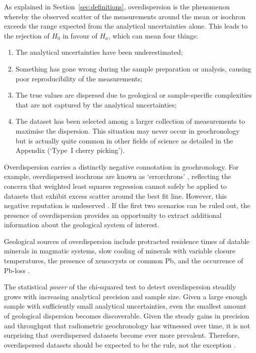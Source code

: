 \documentclass[gchron, manuscript]{copernicus}
\begin{document}
As explained in Section~\ref{sec:definitions}, overdispersion is the
phenomenon whereby the observed scatter of the measurements around the
mean or isochron exceeds the range expected from the analytical
uncertainties alone. This leads to the rejection of $H_0$ in favour of
$H_a$, which can mean four things:

\begin{enumerate}
\item The analytical uncertainties have been underestimated;
\item Something has gone wrong during the sample preparation or
  analysis, causing poor reproducibility of the measurements;
\item The true values are dispersed due to geological or
  sample-specific complexities that are not captured by the analytical
  uncertainties;
\item The dataset has been selected among a larger collection of
  measurements to maximise the dispersion. This situation may never
  occur in geochronology but is actually quite common in other fields
  of science as detailed in the Appendix (`Type~I cherry picking').
\end{enumerate}

Overdispersion carries a distinctly negative connotation in
geochronology. For example, overdispersed isochrons are known as
`errorchrons' \citep{brooks1972}, reflecting the concern that weighted
least squares regression cannot safely be applied to datasets that
exhibit excess scatter around the best fit line. However, this
negative reputation is undeserved \citep{kalsbeek1992}. If the first
two scenarios can be ruled out, the presence of overdispersion
provides an opportunity to extract additional information about the
geological system of interest.\medskip

Geological sources of overdispersion include protracted residence
times of datable minerals in magmatic systems, slow cooling of
minerals with variable closure temperatures, the presence of
xenocrysts or common Pb, and the occurrence of Pb-loss
\citep{galbraith1993,rioux2012,keller2018,klein2024}.\medskip

The statistical \emph{power} of the chi-squared test to detect
overdispersion steadily grows with increasing analytical precision and
sample size. Given a large enough sample with sufficiently small
analytical uncertainties, even the smallest amount of geological
dispersion becomes discoverable.  Given the steady gains in precision
and throughput that radiometric geochronology has witnessed over time,
it is not surprising that overdispersed datasets become ever more
prevalent. Therefore, overdispersed datasets should be expected to be
the rule, not the exception \citep{vermeesch2025c}.
\end{document}
